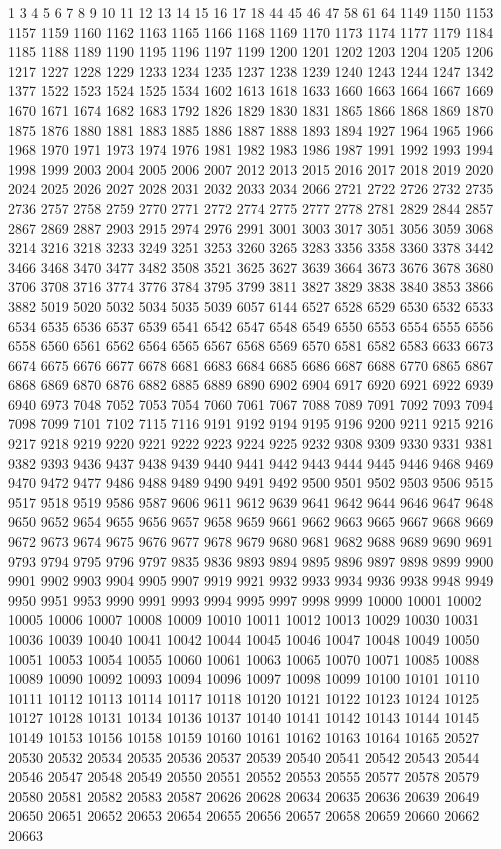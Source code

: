 1 3 4 5 6 7 8 9 10 11 12 13 14 15 16 17 18 44 45 46 47 58 61 64 1149 1150 1153
1157 1159 1160 1162 1163 1165 1166 1168 1169 1170 1173 1174 1177 1179 1184 1185
1188 1189 1190 1195 1196 1197 1199 1200 1201 1202 1203 1204 1205 1206 1217 1227
1228 1229 1233 1234 1235 1237 1238 1239 1240 1243 1244 1247 1342 1377 1522 1523
1524 1525 1534 1602 1613 1618 1633 1660 1663 1664 1667 1669 1670 1671 1674 1682
1683 1792 1826 1829 1830 1831 1865 1866 1868 1869 1870 1875 1876 1880 1881 1883
1885 1886 1887 1888 1893 1894 1927 1964 1965 1966 1968 1970 1971 1973 1974 1976
1981 1982 1983 1986 1987 1991 1992 1993 1994 1998 1999 2003 2004 2005 2006 2007
2012 2013 2015 2016 2017 2018 2019 2020 2024 2025 2026 2027 2028 2031 2032 2033
2034 2066 2721 2722 2726 2732 2735 2736 2757 2758 2759 2770 2771 2772 2774 2775
2777 2778 2781 2829 2844 2857 2867 2869 2887 2903 2915 2974 2976 2991 3001 3003
3017 3051 3056 3059 3068 3214 3216 3218 3233 3249 3251 3253 3260 3265 3283 3356
3358 3360 3378 3442 3466 3468 3470 3477 3482 3508 3521 3625 3627 3639 3664 3673
3676 3678 3680 3706 3708 3716 3774 3776 3784 3795 3799 3811 3827 3829 3838 3840
3853 3866 3882 5019 5020 5032 5034 5035 5039 6057 6144 6527 6528 6529 6530 6532
6533 6534 6535 6536 6537 6539 6541 6542 6547 6548 6549 6550 6553 6554 6555 6556
6558 6560 6561 6562 6564 6565 6567 6568 6569 6570 6581 6582 6583 6633 6673 6674
6675 6676 6677 6678 6681 6683 6684 6685 6686 6687 6688 6770 6865 6867 6868 6869
6870 6876 6882 6885 6889 6890 6902 6904 6917 6920 6921 6922 6939 6940 6973 7048
7052 7053 7054 7060 7061 7067 7088 7089 7091 7092 7093 7094 7098 7099 7101 7102
7115 7116 9191 9192 9194 9195 9196 9200 9211 9215 9216 9217 9218 9219 9220 9221
9222 9223 9224 9225 9232 9308 9309 9330 9331 9381 9382 9393 9436 9437 9438 9439
9440 9441 9442 9443 9444 9445 9446 9468 9469 9470 9472 9477 9486 9488 9489 9490
9491 9492 9500 9501 9502 9503 9506 9515 9517 9518 9519 9586 9587 9606 9611 9612
9639 9641 9642 9644 9646 9647 9648 9650 9652 9654 9655 9656 9657 9658 9659 9661
9662 9663 9665 9667 9668 9669 9672 9673 9674 9675 9676 9677 9678 9679 9680 9681
9682 9688 9689 9690 9691 9793 9794 9795 9796 9797 9835 9836 9893 9894 9895 9896
9897 9898 9899 9900 9901 9902 9903 9904 9905 9907 9919 9921 9932 9933 9934 9936
9938 9948 9949 9950 9951 9953 9990 9991 9993 9994 9995 9997 9998 9999 10000
10001 10002 10005 10006 10007 10008 10009 10010 10011 10012 10013 10029 10030
10031 10036 10039 10040 10041 10042 10044 10045 10046 10047 10048 10049 10050
10051 10053 10054 10055 10060 10061 10063 10065 10070 10071 10085 10088 10089
10090 10092 10093 10094 10096 10097 10098 10099 10100 10101 10110 10111 10112
10113 10114 10117 10118 10120 10121 10122 10123 10124 10125 10127 10128 10131
10134 10136 10137 10140 10141 10142 10143 10144 10145 10149 10153 10156 10158
10159 10160 10161 10162 10163 10164 10165 20527 20530 20532 20534 20535 20536
20537 20539 20540 20541 20542 20543 20544 20546 20547 20548 20549 20550 20551
20552 20553 20555 20577 20578 20579 20580 20581 20582 20583 20587 20626 20628
20634 20635 20636 20639 20649 20650 20651 20652 20653 20654 20655 20656 20657
20658 20659 20660 20662 20663
